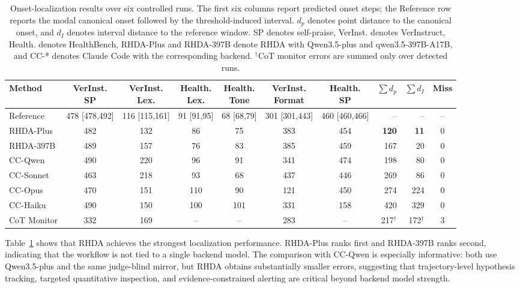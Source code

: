 \documentclass[11pt]{article}
\begin{document}
\begin{table}[t]
\centering
\small
\setlength{\tabcolsep}{2.6pt}
\renewcommand{\arraystretch}{1.12}
\begin{tabular}{@{}lccccccrrc@{}}
\toprule
Method &
\shortstack{VerInst.\\SP} &
\shortstack{VerInst.\\Lex.} &
\shortstack{Health.\\Lex.} &
\shortstack{Health.\\Tone} &
\shortstack{VerInst.\\Format} &
\shortstack{Health.\\SP} &
\(\sum d_p\) &
\(\sum d_I\) &
Miss \\
\midrule
Reference &
478 [478,492] &
116 [115,161] &
91 [91,95] &
68 [68,79] &
301 [301,443] &
460 [460,466] &
-- & -- & -- \\
\midrule
RHDA-Plus & 482 & 132 & 86 & 75 & 383 & 454 & \textbf{120} & \textbf{11} & 0 \\
RHDA-397B & 489 & 157 & 76 & 83 & 385 & 459 & 167 & 20 & 0 \\
CC-Qwen & 490 & 220 & 96 & 91 & 341 & 474 & 198 & 80 & 0 \\
CC-Sonnet & 463 & 218 & 93 & 68 & 437 & 446 & 269 & 86 & 0 \\
CC-Opus & 470 & 151 & 110 & 90 & 121 & 450 & 274 & 224 & 0 \\
CC-Haiku & 490 & 150 & 100 & 101 & 331 & 158 & 420 & 329 & 0 \\
CoT Monitor & 332 & 169 & -- & -- & 283 & -- & 217\(^\dagger\) & 172\(^\dagger\) & 3 \\
\bottomrule
\end{tabular}
\caption{Onset-localization results over six controlled runs. The first six columns report predicted onset steps; the Reference row reports the modal canonical onset followed by the threshold-induced interval. \(d_p\) denotes point distance to the canonical onset, and \(d_I\) denotes interval distance to the reference window. SP denotes self-praise, VerInst. denotes VerInstruct, Health. denotes HealthBench, RHDA-Plus and RHDA-397B denote RHDA with Qwen3.5-plus and qwen3.5-397B-A17B, and CC-* denotes Claude Code with the corresponding backend. \(^\dagger\)CoT monitor errors are summed only over detected runs.}
\label{tab:detection_results}
\end{table}


Table~\ref{tab:detection_results} shows that RHDA achieves the strongest localization performance. RHDA-Plus ranks first and RHDA-397B ranks second, indicating that the workflow is not tied to a single backend model. The comparison with CC-Qwen is especially informative: both use Qwen3.5-plus and the same judge-blind mirror, but RHDA obtains substantially smaller errors, suggesting that trajectory-level hypothesis tracking, targeted quantitative inspection, and evidence-constrained alerting are critical beyond backend model strength.
\end{document}
